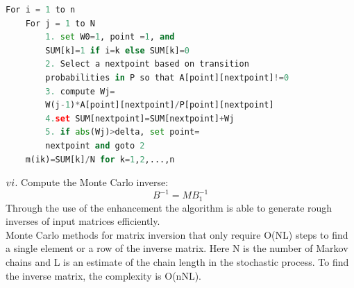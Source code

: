 \documentclass[10pt,journal]{IEEEtran}
\begin{document}
\begin{lstlisting}[language=python, frame=shadowbox]
For i = 1 to n
    For j = 1 to N
        1. set W0=1, point =1, and
        SUM[k]=1 if i=k else SUM[k]=0
        2. Select a nextpoint based on transition 
        probabilities in P so that A[point][nextpoint]!=0
        3. compute Wj=
        W(j-1)*A[point][nextpoint]/P[point][nextpoint]
        4.set SUM[nextpoint]=SUM[nextpoint]+Wj
        5. if abs(Wj)>delta, set point=
        nextpoint and goto 2
    m(ik)=SUM[k]/N for k=1,2,...,n
\end{lstlisting}
\normalsize
$\romannumeral6$. Compute the Monte Carlo inverse:
\[B ^ { - 1 } = M B _ { 1 } ^ { - 1 }\]
Through the use of the enhancement the algorithm is able to generate rough inverses of input matrices efficiently.\\
Monte Carlo methods for matrix inversion that only require O(NL) steps to find a single element or a row of the inverse matrix. Here N is the number of Markov chains and L is an estimate of the chain length in the stochastic process. To find the inverse matrix, the complexity is O(nNL).\\
\end{document}
